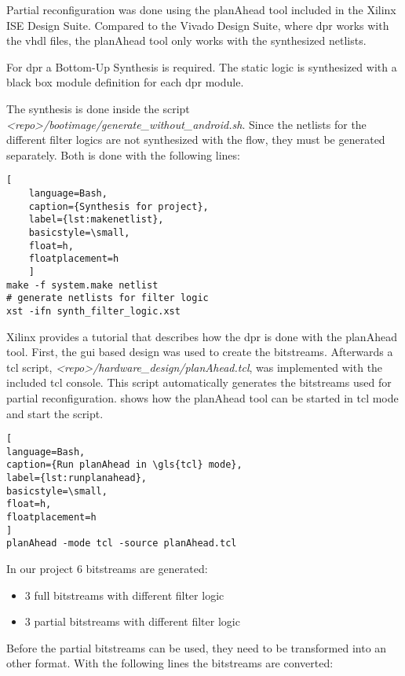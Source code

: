 Partial reconfiguration was done using the planAhead tool included in the Xilinx ISE Design Suite. Compared to the Vivado Design Suite, where \gls{dpr} works with the \gls{vhdl} files, the planAhead tool only works with the synthesized netlists.

For \gls{dpr} a Bottom-Up Synthesis is required. The static logic is synthesized with a black box module definition for each \gls{dpr} module.

The synthesis is done inside the script \emph{<repo>/bootimage/generate\_without\_android.sh}. Since the netlists for the different filter logics are not synthesized with the flow, they must be generated separately. Both is done with the following lines: 

\begin{lstlisting}[
	language=Bash,
	caption={Synthesis for project},
	label={lst:makenetlist},
	basicstyle=\small,
	float=h,
	floatplacement=h
	]
make -f system.make netlist
# generate netlists for filter logic
xst -ifn synth_filter_logic.xst
\end{lstlisting}

Xilinx provides a tutorial \cite{planAheadTutorial} that describes how the \gls{dpr} is done with the planAhead tool. First, the \gls{gui} based design was used to create the bitstreams. Afterwards a \gls{tcl} script, \emph{<repo>/hardware_design/planAhead.tcl}, was implemented with the included \gls{tcl} console. This script automatically generates the bitstreams used for partial reconfiguration.  shows how the planAhead tool can be started in \gls{tcl} mode and start the script.

\begin{lstlisting}[
language=Bash,
caption={Run planAhead in \gls{tcl} mode},
label={lst:runplanahead},
basicstyle=\small,
float=h,
floatplacement=h
]
planAhead -mode tcl -source planAhead.tcl
\end{lstlisting}

In our project $6$ bitstreams are generated:
\begin{itemize}
	\item $3$ full bitstreams with different filter logic
	\item $3$ partial bitstreams with different filter logic
\end{itemize}

Before the partial bitstreams can be used, they need to be transformed into an other format. With the following lines the bitstreams are converted:

